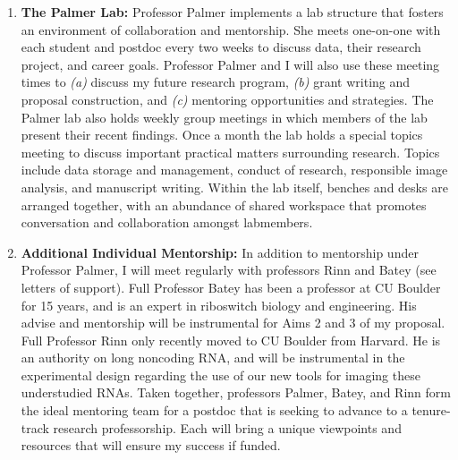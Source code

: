 \begin{enumerate}
  \item \textbf{The Palmer Lab:} Professor Palmer implements a lab structure that fosters an environment of collaboration and mentorship. She meets one-on-one with each student and postdoc every two weeks to discuss data, their research project, and career goals. Professor Palmer and I will also use these meeting times to \textit{(a)} discuss my future research program, \textit{(b)} grant writing and proposal construction, and \textit{(c)} mentoring opportunities and strategies.
  The Palmer lab also holds weekly group meetings in which members of the lab present their recent findings. Once a month the lab holds a special topics meeting to discuss important practical matters surrounding research. Topics include data storage and management, conduct of research, responsible image analysis, and manuscript writing.
  Within the lab itself, benches and desks are arranged together, with an abundance of shared workspace that promotes conversation and collaboration amongst labmembers.

  \item \textbf{Additional Individual Mentorship:} In addition to mentorship under Professor Palmer, I will meet regularly with professors Rinn and Batey (see letters of support). Full Professor Batey has been a professor at CU Boulder for 15 years, and is an expert in riboswitch biology and engineering. His advise and mentorship will be instrumental for Aims 2 and 3 of my proposal. Full Professor Rinn only recently moved to CU Boulder from Harvard. He is an authority on long noncoding RNA, and will be instrumental in the experimental design regarding the use of our new tools for imaging these understudied RNAs. Taken together, professors Palmer, Batey, and Rinn form the ideal mentoring team for a postdoc that is seeking to advance to a tenure-track research professorship. Each will bring a unique viewpoints and resources that will ensure my success if funded.

\end{enumerate}

